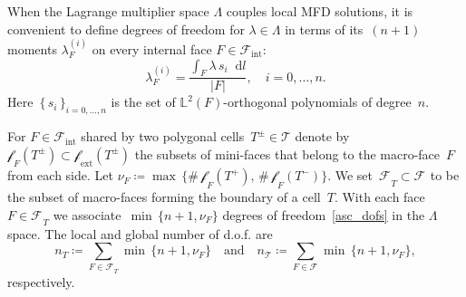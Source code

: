 \documentclass[12pt]{article}
\newcommand{\svginputw}[2][\linewidth]{\def\svgwidth{#1}} %
\newcommand{\vect}[1]{\boldsymbol{\mathbf{#1}}}
\newcommand{\bcell}{T}
\newcommand{\bmesh}{{\vect{\mathcal T}}}
\newcommand{\mmesh}{{\vect{\mathcal \tau}}}
\newcommand{\bface}{F}
\newcommand{\bfaces}[1][]{{\vect{\mathcal F}_{\text{#1}}}}
\newcommand{\mfaces}[1][]{{\vect{\mathcal f}_{\text{#1}}}}
\newcommand{\LTwoSpace}[1][\Omega]{{\mathbb L^2\left({#1}\right)}}
\newcommand*\diff{\mathop{}\!\mathrm{d}}
\begin{document}
	
	When the Lagrange multiplier space $\Lambda$ couples local MFD solutions, it is convenient to define
	degrees of freedom for $\lambda\in\Lambda$ in terms of its~$(n+1)$ moments $\lambda^{(i)}_F$ on every internal face $F\in\bfaces[int]$:
	\begin{equation}\label{asc_dofs}
		\lambda^{(i)}_F=\frac{\int_F  \lambda\,s_i \diff l}{|F|}, \quad i = 0, \dots, n.
	\end{equation}
	Here~$\{\,s_i\,\}_{i=0,\dots,n}$ is the set of $\LTwoSpace[\bface]$-orthogonal polynomials of degree~$n$.
	
	For $F \in \bfaces[int]$ shared by two polygonal cells~$\bcell^\pm\in \bmesh$  denote by~$\mfaces_F(T^\pm) \subset \mfaces_{\text{ext}}(T^\pm)$ the subsets of mini-faces that belong to the macro-face~$F$ from each side. Let $\nu_F \coloneqq \max\,\{ \#\,\mfaces_F(T^+),\,\#\,\mfaces_F(T^-) \}$. We set~$\bfaces_\bcell \subset \bfaces$ to be the subset of macro-faces forming the boundary of a cell~$T$. With each face $F \in \bfaces_\bcell$ we associate~$\min\,\{ n+1, \nu_F \}$ degrees of freedom~\eqref{asc_dofs} in the $\Lambda$ space. The local and global number of d.o.f. are
	\[
		n_\bcell \coloneqq \sum_{F \in \bfaces_\bcell} \min\,\{ n+1, \nu_F \} \quad\text{and}\quad
		n_\bmesh \coloneqq \sum_{F \in \bfaces} \min\,\{ n+1, \nu_F \},
	\]
	respectively.
	
\end{document}

